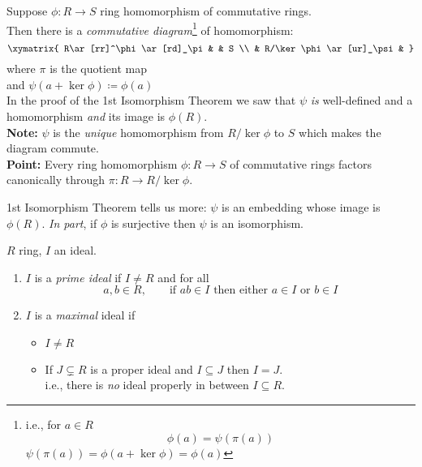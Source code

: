 Suppose $\phi\colon R\to S$ ring homomorphism of commutative rings. \\
Then there is a \emph{commutative diagram}\footnote{i.e., for $a\in R$
\[ \phi(a) = \psi(\pi(a)) \]
\pf $\psi(\pi(a)) = \phi(a+\ker\phi) = \phi(a)$}
of homomorphism: \\
\[ \xymatrix{
R\ar[rr]^\phi\ar[rd]_\pi & & S \\
 & R/\ker\phi \ar[ur]_\psi &
} \]
where $\pi$ is the quotient map \\
and $\psi(a+\ker\phi)\coloneqq\phi(a)$ \\
In the proof of the 1st Isomorphism Theorem we saw that $\psi$ \emph{is} well-defined and a homomorphism \emph{and} its image is $\phi(R)$. \\
\textbf{Note:} $\psi$ is the \emph{unique} homomorphism from $R/\ker\phi$ to $S$ which makes the diagram commute. \\
\textbf{Point:} Every ring homomorphism $\phi\colon R\to S$ of commutative rings factors canonically through $\pi\colon R\to R/\ker\phi$.

1st Isomorphism Theorem tells us more: $\psi$ is an embedding whose image is $\phi(R)$.  \emph{In part}, if $\phi$ is surjective then $\psi$ is an isomorphism.

 $R$ ring, $I$ an ideal.
\begin{enumerate}
\item $I$ is a \emph{prime ideal} if $I\neq R$ and for all
\[ a,b \in R, \qquad \text{if $ab\in I$ then either $a\in I$ or $b\in I$} \]
\item $I$ is a \emph{maximal} ideal if
\begin{itemize}
\item $I\neq R$
\item If $J\subsetneq R$ is a proper ideal and $I\subseteq J$ then $I=J$. \\
i.e., there is \emph{no} ideal properly in between $I\subseteq R$.
\end{itemize}
\end{enumerate}


